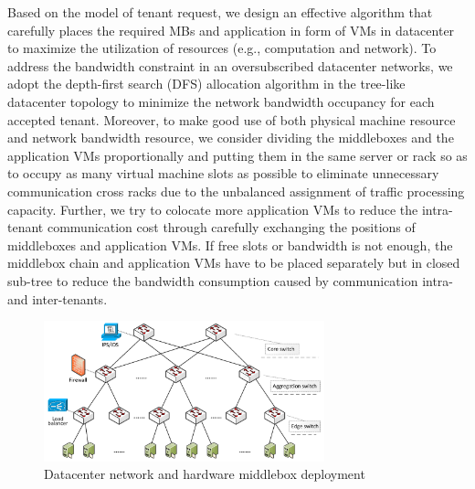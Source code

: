 \documentclass[review]{elsarticle}
\begin{document}
Based on the model of tenant request, we design an effective algorithm that carefully places the required MBs and application in form of VMs in datacenter to maximize the utilization of resources (e.g., computation and network). To address the bandwidth constraint in an oversubscribed datacenter networks, we adopt the depth-first search (DFS) allocation algorithm in the tree-like datacenter topology to minimize the network bandwidth occupancy for each accepted tenant. Moreover, to make good use of both physical machine resource and network bandwidth resource, we consider dividing the middleboxes and the application VMs proportionally and putting them in the same server or rack so as to occupy as many virtual machine slots as possible to eliminate unnecessary communication cross racks due to the unbalanced assignment of traffic processing capacity. Further, we try to colocate more application VMs to reduce the intra-tenant communication cost through carefully exchanging the positions of middleboxes and application VMs. If free slots or bandwidth is not enough, the middlebox chain and application VMs have to be placed separately but in closed sub-tree to reduce the bandwidth consumption caused by communication intra- and inter-tenants. 


\begin{figure}
	\centering
		\includegraphics[width=3.2in]{fig/topology.pdf}
	\caption{Datacenter network and hardware middlebox deployment}
	\label{fig:topo}
\end{figure}

\end{document}
